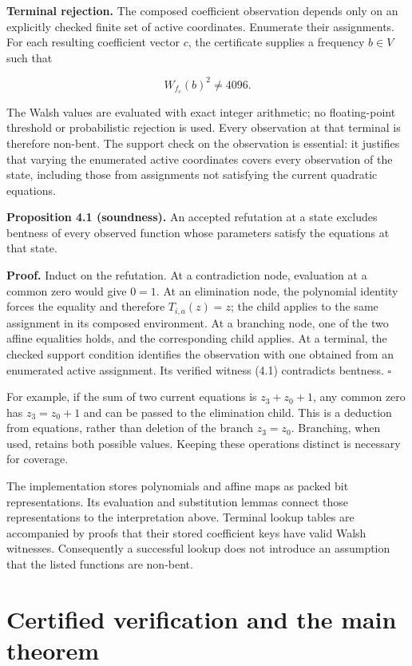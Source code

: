 \documentclass[pdflatex,sn-mathphys-num]{sn-jnl}
\begin{document}
\textbf{Terminal rejection.} The composed coefficient observation depends only on an explicitly checked finite set of active coordinates. Enumerate their assignments. For each resulting coefficient vector $c$, the certificate supplies a frequency $b\in V$ such that

\[
W_{f_c}(b)^2\ne4096. \tag{4.1}
\]

The Walsh values are evaluated with exact integer arithmetic; no floating-point threshold or probabilistic rejection is used. Every observation at that terminal is therefore non-bent. The support check on the observation is essential: it justifies that varying the enumerated active coordinates covers every observation of the state, including those from assignments not satisfying the current quadratic equations.

\textbf{Proposition 4.1 (soundness).} An accepted refutation at a state excludes bentness of every observed function whose parameters satisfy the equations at that state.

\textbf{Proof.} Induct on the refutation. At a contradiction node, evaluation at a common zero would give $0=1$. At an elimination node, the polynomial identity forces the equality and therefore $T_{i,a}(z)=z$; the child applies to the same assignment in its composed environment. At a branching node, one of the two affine equalities holds, and the corresponding child applies. At a terminal, the checked support condition identifies the observation with one obtained from an enumerated active assignment. Its verified witness (4.1) contradicts bentness. \hfill$\square$

For example, if the sum of two current equations is $z_3+z_0+1$, any common zero has $z_3=z_0+1$ and can be passed to the elimination child. This is a deduction from equations, rather than deletion of the branch $z_3=z_0$. Branching, when used, retains both possible values. Keeping these operations distinct is necessary for coverage.

The implementation stores polynomials and affine maps as packed bit representations. Its evaluation and substitution lemmas connect those representations to the interpretation above. Terminal lookup tables are accompanied by proofs that their stored coefficient keys have valid Walsh witnesses. Consequently a successful lookup does not introduce an assumption that the listed functions are non-bent.

\section{Certified verification and the main theorem}\label{sec:5}
\end{document}
